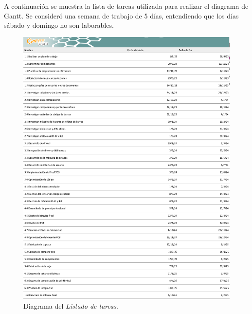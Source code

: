 \documentclass[
11pt, %
codirector, %
]{charter}
\begin{document}
A continuación se muestra la lista de tareas utilizada para realizar el diagrama de Gantt. Se consideró una semana de trabajo de 5 días, entendiendo que los días sábado y domingo no son laborables.
\begin{figure}[htpb]
\centering 
\includegraphics[width=\textwidth]{./Figuras/Lista.png}
\caption{Diagrama del \textit{Listado de tareas}.}
\label{fig:AoN}
\end{figure}
\end{document}
